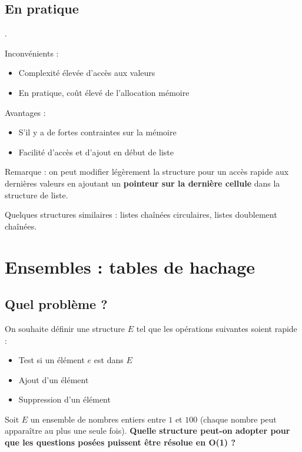 \documentclass{../cours}
\begin{document}
\subsection{En pratique} .

Inconvénients :
\begin{itemize}
\item Complexité élevée d'accès aux valeurs 
\item En pratique, coût élevé de l'allocation mémoire
\end{itemize}

Avantages :
\begin{itemize}
\item S'il y a de fortes contraintes sur la mémoire
\item Facilité d'accès et d'ajout en début de liste
\end{itemize}

Remarque : on peut modifier légèrement la structure pour un accès rapide aux dernières valeurs en ajoutant un \textbf{pointeur sur la dernière cellule} dans la structure de liste.

Quelques structures similaires : listes chaînées circulaires, listes doublement chaînées.

\section{Ensembles : tables de hachage}

\subsection{Quel problème ?}

On souhaite définir une structure $E$ tel que les opérations suivantes soient rapide :

\begin{itemize}
\item Test si un élément $e$ est dans $E$
\item Ajout d'un élément
\item Suppression d'un élément
\end{itemize}

\begin{Example}
Soit $E$ un ensemble de nombres entiers entre $1$ et $100$ (chaque nombre peut apparaître au plus une seule fois). \textbf{Quelle structure peut-on adopter pour que les questions posées puissent être résolue en O(1) ?}

\end{Example}
\end{document}
